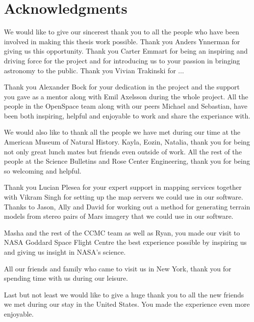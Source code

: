 \cleardoublepage
{}
{}
\chapter*{Acknowledgments}

We would like to give our sincerest thank you to all the people who have been involved in making this thesis work possible. Thank you Anders Ynnerman for giving us this opportunity. Thank you Carter Emmart for being an inspiring and driving force for the project and for introducing us to your passion in bringing astronomy to the public. Thank you Vivian Trakinski for ...

Thank you Alexander Bock for your dedication in the project and the support you gave as a mentor along with Emil Axelsson during the whole project. All the people in the OpenSpace team along with our peers Michael and Sebastian, have been both inspiring, helpful and enjoyable to work and share the experiance with.

We would also like to thank all the people we have met during our time at the American Museum of Natural History. Kayla, Eozin, Natalia, thank you for being not only great lunch mates but friends even outside of work.
All the rest of the people at the Science Bulletins and Rose Center Engineering, thank you for being so welcoming and helpful.

Thank you Lucian Plesea for your expert support in mapping services together with Vikram Singh for setting up the map servers we could use in our software. Thanks to Jason, Ally and David for working out a method for generating terrain models from stereo pairs of Mars imagery that we could use in our software.

Masha and the rest of the CCMC team as well as Ryan, you made our visit to NASA Goddard Space Flight Centre the best experience possible by inspiring us and giving us insight in NASA's science.

All our friends and family who came to visit us in New York, thank you for spending time with us during our leisure.

Last but not least we would like to give a huge thank you to all the new friends we met during our stay in the United States. You made the experience even more enjoyable.


\newpage
